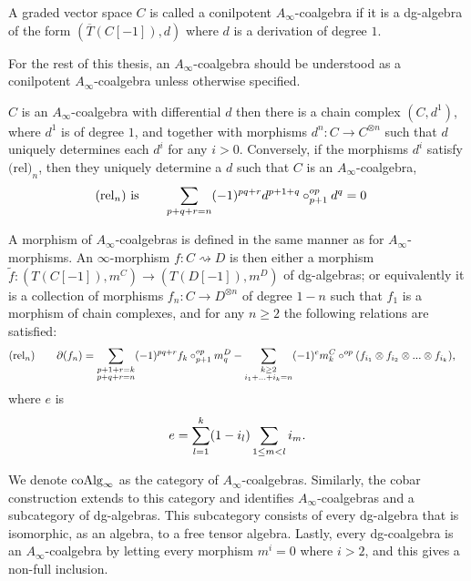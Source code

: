 \documentclass[../thesis.tex]{subfiles}
\begin{document}
        \begin{definition}
            A graded vector space $C$ is called a conilpotent $A_\infty$-coalgebra if it is a dg-algebra of the form $(\overline{T}(C[-1]), d)$ where $d$ is a derivation of degree $1$.
        \end{definition}

        \begin{remark}
            For the rest of this thesis, an $A_\infty$-coalgebra should be understood as a conilpotent $A_\infty$-coalgebra unless otherwise specified.
        \end{remark}

        \begin{corollary}
            $C$ is an $A_\infty$-coalgebra with differential $d$ then there is a chain complex $(C, d^1)$, where $d^1$ is of degree $1$, and together with morphisms $d^n : C \rightarrow C^{\otimes n}$ such that $d$ uniquely determines each $d^i$ for any $i>0$. Conversely, if the morphisms $d^i$ satisfy $\text{(rel)}_n$, then they uniquely determine a $d$ such that $C$ is an $A_\infty$-coalgebra,
            \begin{align*}
                (\text{rel}_n)\tt{ is}\qquad & \sum_{p+q+r = n}(-1)^{pq+r}d^{p+1+q}\circ^{op}_{p+1}d^q = 0
            \end{align*}
        \end{corollary}

        A morphism of $A_\infty$-coalgebras is defined in the same manner as for $A_\infty$-morphisms. An $\infty$-morphism $f: C \rightsquigarrow D$ is then either a morphism $\widetilde{f}: (T(C[-1]), m^C) \rightarrow (T(D[-1]),m^D)$ of dg-algebras; or equivalently it is a collection of morphisms $f_n : C \rightarrow D^{\otimes n}$ of degree $1-n$ such that $f_1$ is a morphism of chain complexes, and for any $n\geq 2$ the following relations are satisfied:
        \begin{align*}
            & (\text{rel}_n)\qquad \partial(f_n) = \sum_{\substack{p + 1 + r = k \\ p + q + r = n}}(-1)^{pq+r}f_k\circ^{op}_{p+1}m^D_q - \sum_{\substack{k\geq 2 \\ i_1 + ... + i_k = n}}(-1)^{e}m^C_k \circ^{op} (f_{i_1}\otimes f_{i_2}\otimes ... \otimes f_{i_k})\tt{,}
        \end{align*}
        where $e$ is
        \begin{align*}
            e = \sum_{l = 1}^k(1-i_l)\sum_{1\leq m < l}i_m\tt{.}
        \end{align*}

        We denote $\tt{coAlg}_\infty$ as the category of $A_\infty$-coalgebras. Similarly, the cobar construction extends to this category and identifies $A_\infty$-coalgebras and a subcategory of dg-algebras. This subcategory consists of every dg-algebra that is isomorphic, as an algebra, to a free tensor algebra. Lastly, every dg-coalgebra is an $A_\infty$-coalgebra by letting every morphism $m^i = 0$ where $i>2$, and this gives a non-full inclusion. 
\end{document}
